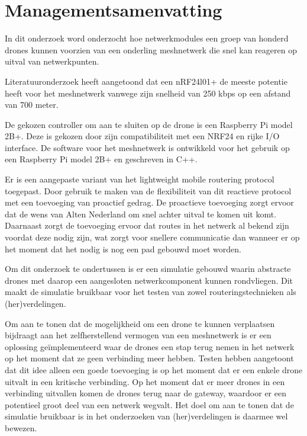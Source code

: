 \documentclass[a4paper, 11pt, oneside]{report}
\begin{document}
\chapter*{Managementsamenvatting}


In dit onderzoek word onderzocht hoe netwerkmodules een groep van honderd drones kunnen voorzien van een onderling meshnetwerk die snel kan reageren op uitval van netwerkpunten.

Literatuuronderzoek heeft aangetoond dat een nRF24l01+ de meeste potentie heeft voor het meshnetwerk vanwege zijn snelheid van 250 kbps op een afstand van 700 meter.

De gekozen controller om aan te sluiten op de drone is een Raspberry Pi model 2B+. Deze is gekozen door zijn compatibiliteit met een NRF24 en rijke I/O interface. 
De software voor het meshnetwerk is ontwikkeld voor het gebruik op een Raspberry Pi model 2B+ en geschreven in C++.   

Er is een aangepaste variant van het lightweight mobile routering protocol toegepast. Door gebruik te maken van de flexibiliteit van dit reactieve protocol met een toevoeging van proactief gedrag. De proactieve toevoeging zorgt ervoor dat de wens van Alten Nederland om snel achter uitval te komen uit komt. Daarnaast zorgt de toevoeging ervoor dat routes in het netwerk al bekend zijn voordat deze nodig zijn, wat zorgt voor snellere communicatie dan wanneer er op het moment dat het nodig is nog een pad gebouwd moet worden.

Om dit onderzoek te ondertussen is er een simulatie gebouwd waarin abstracte drones met daarop een aangesloten netwerkcomponent kunnen rondvliegen. Dit maakt de simulatie bruikbaar voor het testen van zowel routeringstechnieken als (her)verdelingen. 

Om aan te tonen dat de mogelijkheid om een drone te kunnen verplaatsen bijdraagt aan het zelfherstellend vermogen van een meshnetwerk is er een oplossing geïmplementeerd waar de drones een stap terug nemen in het netwerk op het moment dat ze geen verbinding meer hebben.  Testen hebben aangetoont dat dit idee alleen een goede toevoeging is op het moment dat er een enkele drone uitvalt in een kritische verbinding. Op het moment dat er meer drones in een verbinding uitvallen komen de drones terug naar de gateway, waardoor er een potentieel groot deel van een netwerk wegvalt. Het doel om aan te tonen dat de simulatie bruikbaar is in het onderzoeken van (her)verdelingen is daarmee wel bewezen.
\end{document}
